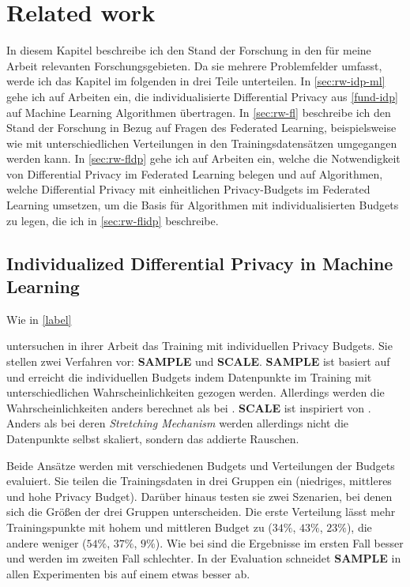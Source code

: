 \chapter{Related work}\label{chap:related-work}

In diesem Kapitel beschreibe ich den Stand der Forschung in den für meine Arbeit relevanten Forschungsgebieten. Da sie mehrere Problemfelder umfasst, werde ich das Kapitel im folgenden in drei Teile unterteilen. In \autoref{sec:rw-idp-ml} gehe ich auf Arbeiten ein, die individualisierte Differential Privacy aus \autoref{fund-idp} auf Machine Learning Algorithmen übertragen. In \autoref{sec:rw-fl} beschreibe ich den Stand der Forschung in Bezug auf Fragen des Federated Learning, beispielsweise wie mit unterschiedlichen Verteilungen in den Trainingsdatensätzen umgegangen werden kann. In \autoref{sec:rw-fldp} gehe ich auf Arbeiten ein, welche die Notwendigkeit von Differential Privacy im Federated Learning belegen und auf Algorithmen, welche Differential Privacy mit einheitlichen Privacy-Budgets im Federated Learning umsetzen, um die Basis für Algorithmen mit individualisierten Budgets zu legen, die ich in \autoref{sec:rw-flidp} beschreibe.

\section{Individualized Differential Privacy in Machine Learning}\label{sec:rw-idp-ml}

Wie in \autoref{label}

\textcite{boenisch:2023} untersuchen in ihrer Arbeit das Training mit individuellen Privacy Budgets. Sie stellen zwei Verfahren vor: \textbf{SAMPLE} und \textbf{SCALE}. \textbf{SAMPLE} ist basiert auf \textcite{jorgensen:2015} und erreicht die individuellen Budgets indem Datenpunkte im Training mit unterschiedlichen Wahrscheinlichkeiten gezogen werden. Allerdings werden die Wahrscheinlichkeiten anders berechnet als bei \textcite{jorgensen:2015}. \textbf{SCALE} ist inspiriert von \textcite{alaggan:2016}. Anders als bei deren \textit{Stretching Mechanism} werden allerdings nicht die Datenpunkte selbst skaliert, sondern das addierte Rauschen. 

Beide Ansätze werden mit verschiedenen Budgets und Verteilungen der Budgets evaluiert. Sie teilen die Trainingsdaten in drei Gruppen ein (niedriges, mittleres und hohe Privacy Budget). Darüber hinaus testen sie zwei Szenarien, bei denen sich die Größen der drei Gruppen unterscheiden. Die erste Verteilung lässt mehr Trainingspunkte mit hohem und mittleren Budget zu ($34\%$, $43\%$, $23\%$), die andere weniger ($54\%$, $37\%$, $9\%$). Wie bei \textcite{jorgensen:2015} sind die Ergebnisse im ersten Fall besser und werden im zweiten Fall schlechter. In der Evaluation schneidet \textbf{SAMPLE} in allen Experimenten bis auf einem etwas besser ab.

